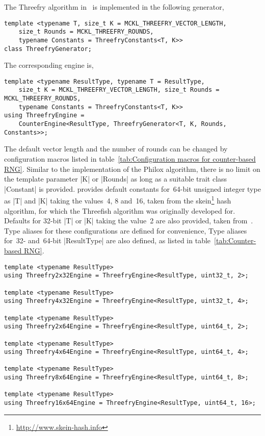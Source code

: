 The Threefry algorithm in~\cite{Salmon:2011um} is implemented in the following
generator,
\begin{verbatim}
template <typename T, size_t K = MCKL_THREEFRY_VECTOR_LENGTH,
    size_t Rounds = MCKL_THREEFRY_ROUNDS,
    typename Constants = ThreefryConstants<T, K>>
class ThreefryGenerator;
\end{verbatim}
The corresponding \rng engine is,
\begin{verbatim}
template <typename ResultType, typename T = ResultType,
    size_t K = MCKL_THREEFRY_VECTOR_LENGTH, size_t Rounds = MCKL_THREEFRY_ROUNDS,
    typename Constants = ThreefryConstants<T, K>>
using ThreefryEngine =
    CounterEngine<ResultType, ThreefryGenerator<T, K, Rounds, Constants>>;
\end{verbatim}
The default vector length and the number of rounds can be changed by
configuration macros listed in table~\ref{tab:Configuration macros for
counter-based RNG}. Similar to the implementation of the Philox algorithm,
there is no limit on the template parameter |K| or |Rounds| as long as a
suitable trait class |Constant| is provided. \mckl provides default constants
for~64-bit unsigned integer type as |T| and |K| taking the values~4, 8 and~16,
taken from the skein\footnote{\url{http://www.skein-hash.info}} hash algorithm,
for which the Threefish algorithm was originally developed for. Defaults for
32-bit |T| or |K| taking the value~2 are also provided, taken
from~\cite{Salmon:2011um}. Type aliases for these configurations are defined
for convenience, Type aliases for~32- and~64-bit |ResultType| are also defined,
as listed in table~\ref{tab:Counter-based RNG}.
\begin{verbatim}
template <typename ResultType>
using Threefry2x32Engine = ThreefryEngine<ResultType, uint32_t, 2>;

template <typename ResultType>
using Threefry4x32Engine = ThreefryEngine<ResultType, uint32_t, 4>;

template <typename ResultType>
using Threefry2x64Engine = ThreefryEngine<ResultType, uint64_t, 2>;

template <typename ResultType>
using Threefry4x64Engine = ThreefryEngine<ResultType, uint64_t, 4>;

template <typename ResultType>
using Threefry8x64Engine = ThreefryEngine<ResultType, uint64_t, 8>;

template <typename ResultType>
using Threefry16x64Engine = ThreefryEngine<ResultType, uint64_t, 16>;
\end{verbatim}

